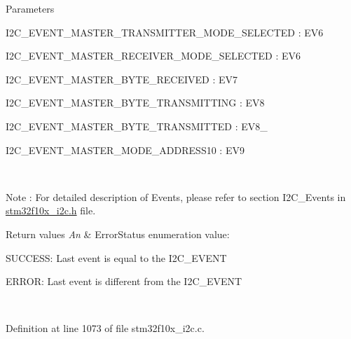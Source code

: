 \begin{DoxyParams}{Parameters}
\begin{DoxyItemize}
I2\+C\+\_\+\+E\+V\+E\+N\+T\+\_\+\+M\+A\+S\+T\+E\+R\+\_\+\+T\+R\+A\+N\+S\+M\+I\+T\+T\+E\+R\+\_\+\+M\+O\+D\+E\+\_\+\+S\+E\+L\+E\+C\+T\+ED \+: E\+V6 \item I2\+C\+\_\+\+E\+V\+E\+N\+T\+\_\+\+M\+A\+S\+T\+E\+R\+\_\+\+R\+E\+C\+E\+I\+V\+E\+R\+\_\+\+M\+O\+D\+E\+\_\+\+S\+E\+L\+E\+C\+T\+ED \+: E\+V6 \item I2\+C\+\_\+\+E\+V\+E\+N\+T\+\_\+\+M\+A\+S\+T\+E\+R\+\_\+\+B\+Y\+T\+E\+\_\+\+R\+E\+C\+E\+I\+V\+ED \+: E\+V7 \item I2\+C\+\_\+\+E\+V\+E\+N\+T\+\_\+\+M\+A\+S\+T\+E\+R\+\_\+\+B\+Y\+T\+E\+\_\+\+T\+R\+A\+N\+S\+M\+I\+T\+T\+I\+NG \+: E\+V8 \item I2\+C\+\_\+\+E\+V\+E\+N\+T\+\_\+\+M\+A\+S\+T\+E\+R\+\_\+\+B\+Y\+T\+E\+\_\+\+T\+R\+A\+N\+S\+M\+I\+T\+T\+ED \+: E\+V8\+\_ \item I2\+C\+\_\+\+E\+V\+E\+N\+T\+\_\+\+M\+A\+S\+T\+E\+R\+\_\+\+M\+O\+D\+E\+\_\+\+A\+D\+D\+R\+E\+S\+S10 \+: E\+V9\end{DoxyItemize}
\\
\hline
\end{DoxyParams}
\begin{DoxyNote}{Note}
\+: For detailed description of Events, please refer to section I2\+C\+\_\+\+Events in \hyperlink{stm32f10x__i2c_8h}{stm32f10x\+\_\+i2c.\+h} file.
\end{DoxyNote}

\begin{DoxyRetVals}{Return values}
{\em An} & Error\+Status enumeration value\+:
\begin{DoxyItemize}
\item S\+U\+C\+C\+E\+SS\+: Last event is equal to the I2\+C\+\_\+\+E\+V\+E\+NT
\item E\+R\+R\+OR\+: Last event is different from the I2\+C\+\_\+\+E\+V\+E\+NT 
\end{DoxyItemize}\\
\hline
\end{DoxyRetVals}


Definition at line 1073 of file stm32f10x\+\_\+i2c.\+c.

\mbox{\label{group___i2_c___exported___functions_ga9d4f8fe9f7232696114b5578b1223963}} 
